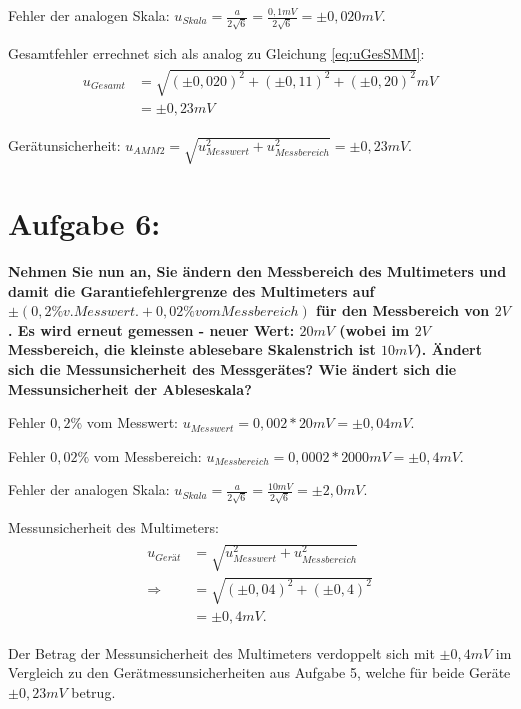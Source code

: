 \documentclass[
]{article}
\begin{document}
Fehler der analogen Skala:
\(u_{Skala} = \frac{a}{2\sqrt{6}} = \frac{0,1mV}{2\sqrt{6}}=\pm0,020mV\).

Gesamtfehler errechnet sich als analog zu Gleichung \ref{eq:uGesSMM}:
\begin{align*}
  \begin{split}
u_{Gesamt}&= \sqrt{(\pm 0,020)^2+(\pm 0,11)^2+(\pm0,20)^2}mV\\
          &= \pm 0,23mV
\end{split}
\end{align*}

Gerätunsicherheit:
\(u_{AMM2} = \sqrt{u_{Messwert}^2+u_{Messbereich}^2} = \pm0,23 mV\).

\hypertarget{aufgabe-6}{%
\section{Aufgabe 6:}\label{aufgabe-6}}

\textbf{Nehmen Sie nun an, Sie ändern den Messbereich des Multimeters
und damit die Garantiefehlergrenze des Multimeters auf
\(\pm(0,2\% v. Messwert. + 0,02\% vom Messbereich)\) für den Messbereich
von \(2 V\). Es wird erneut gemessen - neuer Wert: \(20 mV\) (wobei im
\(2V\) Messbereich, die kleinste ablesebare Skalenstrich ist \(10mV\)).
Ändert sich die Messunsicherheit des Messgerätes? Wie ändert sich die
Messunsicherheit der Ableseskala?}

Fehler \(0,2\%\) vom Messwert:
\(u_{Messwert} = 0,002 * 20mV = \pm 0,04mV\).

Fehler \(0,02\%\) vom Messbereich:
\(u_{Messbereich} = 0,0002 * 2000mV = \pm0,4mV\).

Fehler der analogen Skala:
\(u_{Skala} = \frac{a}{2\sqrt{6}} = \frac{10mV}{2\sqrt{6}}=\pm2,0mV\).

Messunsicherheit des Multimeters: \begin{align*}
  \begin{split}
    u_{Gerät} &= \sqrt{u_{Messwert}^2+u_{Messbereich}^2}\\
    \Rightarrow  &= \sqrt{(\pm 0,04)^2+(\pm 0,4)^2}\\
                &= \pm 0,4mV.
  \end{split}
\end{align*}

Der Betrag der Messunsicherheit des Multimeters verdoppelt sich mit
\(\pm 0,4mV\) im Vergleich zu den Gerätmessunsicherheiten aus Aufgabe 5,
welche für beide Geräte \(\pm 0,23mV\) betrug.
\end{document}
